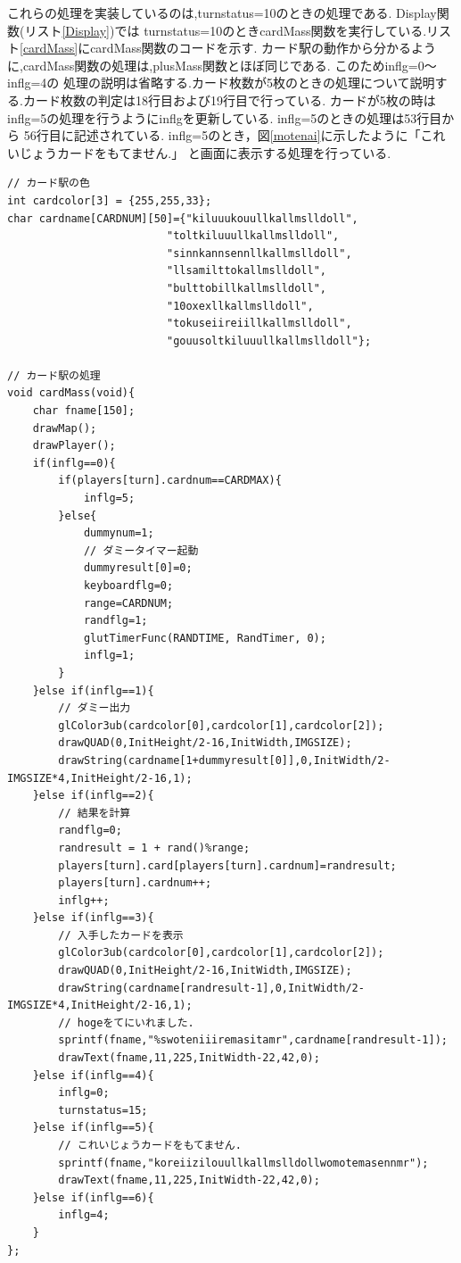 \documentclass[a4j]{jarticle}
\begin{document}
        これらの処理を実装しているのは,turnstatus=10のときの処理である. Display関数(リスト\ref{Display})では
        turnstatus=10のときcardMass関数を実行している.リスト\ref{cardMass}にcardMass関数のコードを示す.
        カード駅の動作から分かるように,cardMass関数の処理は,plusMass関数とほぼ同じである. このためinflg=0～inflg=4の
        処理の説明は省略する.カード枚数が5枚のときの処理について説明する.カード枚数の判定は18行目および19行目で行っている.
        カードが5枚の時はinflg=5の処理を行うようにinflgを更新している. inflg=5のときの処理は53行目から
        56行目に記述されている. inflg=5のとき，図\ref{motenai}に示したように「これいじょうカードをもてません.」
        と画面に表示する処理を行っている.
        \begin{lstlisting}[basicstyle=\ttfamily\footnotesize, frame=single,label=cardMass,caption=cardMass関数]
// カード駅の色
int cardcolor[3] = {255,255,33};
char cardname[CARDNUM][50]={"kiluuukouullkallmslldoll",
                         "toltkiluuullkallmslldoll",
                         "sinnkannsennllkallmslldoll",
                         "llsamilttokallmslldoll",
                         "bulttobillkallmslldoll",
                         "10oxexllkallmslldoll",
                         "tokuseiireiillkallmslldoll",
                         "gouusoltkiluuullkallmslldoll"};

// カード駅の処理
void cardMass(void){
    char fname[150];
    drawMap();
    drawPlayer(); 
    if(inflg==0){
        if(players[turn].cardnum==CARDMAX){
            inflg=5;
        }else{
            dummynum=1;
            // ダミータイマー起動
            dummyresult[0]=0;
            keyboardflg=0;
            range=CARDNUM;
            randflg=1;
            glutTimerFunc(RANDTIME, RandTimer, 0);
            inflg=1;
        }            
    }else if(inflg==1){
        // ダミー出力
        glColor3ub(cardcolor[0],cardcolor[1],cardcolor[2]);
        drawQUAD(0,InitHeight/2-16,InitWidth,IMGSIZE);
        drawString(cardname[1+dummyresult[0]],0,InitWidth/2-IMGSIZE*4,InitHeight/2-16,1);           
    }else if(inflg==2){
        // 結果を計算
        randflg=0;
        randresult = 1 + rand()%range;
        players[turn].card[players[turn].cardnum]=randresult;
        players[turn].cardnum++;
        inflg++;
    }else if(inflg==3){
        // 入手したカードを表示
        glColor3ub(cardcolor[0],cardcolor[1],cardcolor[2]);
        drawQUAD(0,InitHeight/2-16,InitWidth,IMGSIZE);
        drawString(cardname[randresult-1],0,InitWidth/2-IMGSIZE*4,InitHeight/2-16,1); 
        // hogeをてにいれました.
        sprintf(fname,"%swoteniiiremasitamr",cardname[randresult-1]);
        drawText(fname,11,225,InitWidth-22,42,0);                     
    }else if(inflg==4){
        inflg=0;
        turnstatus=15;
    }else if(inflg==5){
        // これいじょうカードをもてません.
        sprintf(fname,"koreiizilouullkallmslldollwomotemasennmr");
        drawText(fname,11,225,InitWidth-22,42,0);            
    }else if(inflg==6){
        inflg=4;
    }
};
        \end{lstlisting}
\end{document}
